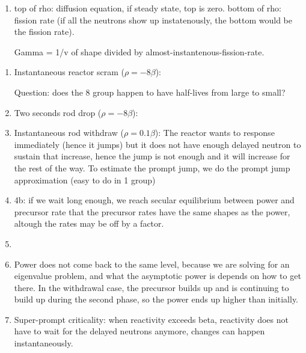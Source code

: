 \documentclass{school-22.211-notes}
\begin{document}
\begin{enumerate}
\item top of rho: diffusion equation, if steady state, top is zero. 
bottom of rho: fission rate (if all the neutrons show up instatenously, the bottom would be the fission rate). 

Gamma = 1/v of shape divided by almost-instantenous-fission-rate. 

\end{enumerate}

\clearpage
{}

\begin{enumerate}
\item Instantaneous reactor scram ($\rho = - 8 \beta$): 

Question: does the 8 group happen to have half-lives from large to small? 
\item Two seconds rod drop ($\rho = - 8 \beta$):

\item Instantaneous rod withdraw ($\rho = 0.1 \beta$): 
The reactor wants to response immediately (hence it jumps) but it does not have enough delayed neutron to sustain that increase, hence the jump is not enough and it will increase for the rest of the way. To estimate the prompt jump, we do the prompt jump approximation (easy to do in 1 group)

\item 4b: if we wait long enough, we reach secular equilibrium between power and precursor rate that the precursor rates have the same shapes as the power, altough the rates may be off by a factor. 

\item 

\item Power does not come back to the same level, because we are solving for an eigenvalue problem, and what the asymptotic power is depends on how to get there. In the withdrawal case, the precursor builds up and is continuing to build up during the second phase, so the power ends up higher than initially. 


\item Super-prompt criticality: when reactivity exceeds beta, reactivity does not have to wait for the delayed neutrons anymore, changes can happen instantaneously.  
\end{enumerate}



\clearpage
{}
\end{document}
